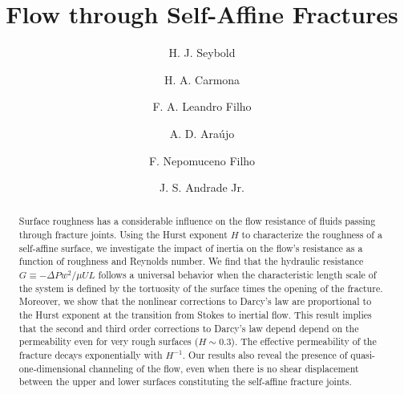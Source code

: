 \documentclass[aps,pre,
superscriptaddress,
twocolumn,
notitlepage,
10pt,]{revtex4-1}
\begin{document}
\title{Flow through Self-Affine Fractures}

\author{H. J. Seybold} %

\author{H. A. Carmona} %

\author{F. A. Leandro Filho} %




\author{A. D. Ara\'ujo} %

\author{F. Nepomuceno Filho}

\author{J. S. Andrade Jr.} 

\begin{abstract}
	Surface roughness has a considerable influence on the flow resistance of fluids
passing through fracture joints. Using the Hurst exponent $H$ to characterize
the roughness of a self-affine surface, we investigate the impact of inertia on
the flow's resistance as a function of roughness and Reynolds number. We find
that the hydraulic resistance $G\equiv -\Delta P w^{2}/\mu U L$ follows a
universal behavior when the characteristic length scale of the system is
defined by the tortuosity of the surface times the opening of the fracture.
Moreover, we show that the nonlinear corrections to Darcy's law are
proportional to the Hurst exponent at the transition from Stokes to inertial
flow. This result implies that the second and third order corrections to
Darcy's law depend  depend on the permeability even for very rough surfaces ($H
\sim 0.3$). The effective permeability of the fracture decays exponentially
with $H^{-1}$. Our results also reveal the presence of quasi-one-dimensional
channeling of the flow, even when there is no shear displacement between the
upper and lower surfaces constituting the self-affine fracture joints.
\end{abstract}
\end{document}
